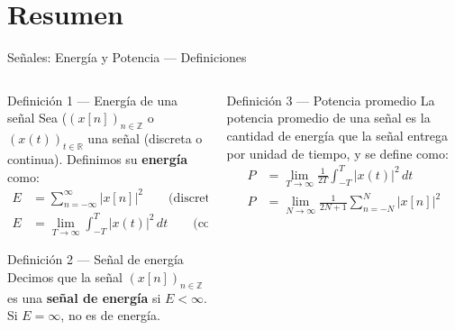 \documentclass[
    10pt,
    aspectratio=169,
    xcolor={dvipsnames},
    spanish,
    ]{beamer}
\begin{document}
\section{Resumen}
\begin{frame}{Señales: Energía y Potencia — Definiciones}
\begin{columns}[T,onlytextwidth]
  \begin{column}{0.5\textwidth}
    \begin{block}{Definición 1 — Energía de una señal}
      Sea ($(x[n])_{n\in\mathbb{Z}}$ o $(x(t))_{t\in\mathbb{R}}$ una señal (discreta o continua). Definimos su \textbf{energía} como:
      \begin{align*}
        E &= \sum_{n=-\infty}^{\infty} |x[n]|^2  \qquad \text{(discreto)}\\
        E &= \lim_{T\to\infty}\int_{-T}^{T} \lvert x(t) \rvert^{2}\,dt \qquad \text{(continuo)}
      \end{align*}
    \end{block}

    \begin{block}{Definición 2 — Señal de energía}
      Decimos que la señal $(x[n])_{n \in \mathbb{Z}}$ es una \textbf{señal de energía} si \(E<\infty\). Si \(E=\infty\), no es de energía.
    \end{block}
  \end{column}

  \begin{column}{0.45\textwidth}
    \begin{block}{Definición 3 — Potencia promedio}
      La potencia promedio de una señal es la cantidad de energía que la señal entrega por unidad de tiempo, y se define como:
      \begin{align*}
        P &= \lim_{T \to \infty} \frac{1}{2T} \int_{-T}^{T} |x(t)|^2 \, dt \\
        P &= \lim_{N \to \infty} \frac{1}{2N+1} \sum_{n=-N}^{N} |x[n]|^2
      \end{align*}
    \end{block}
  \end{column}
\end{columns}
\end{frame}
\end{document}
